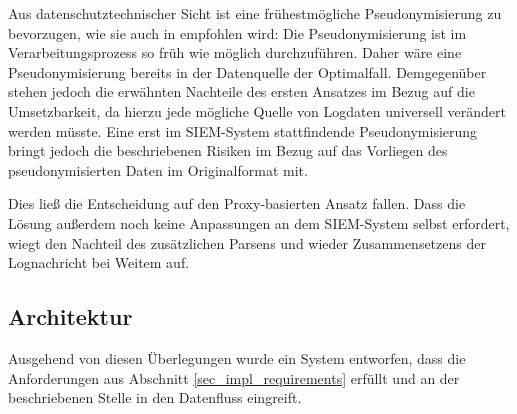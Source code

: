 Aus datenschutztechnischer Sicht ist eine frühestmögliche Pseudonymisierung zu bevorzugen, wie sie auch in \cite{schwartmann2017} empfohlen wird: 
\glqq{}Die Pseudonymisierung ist im Verarbeitungsprozess so früh wie möglich durchzuführen.\grqq{}
Daher wäre eine Pseudonymisierung bereits in der Datenquelle der Optimalfall. Demgegenüber stehen jedoch die erwähnten Nachteile des ersten Ansatzes im Bezug auf die Umsetzbarkeit, da hierzu jede mögliche Quelle von Logdaten universell verändert werden müsste. Eine erst im SIEM-System stattfindende Pseudonymisierung bringt jedoch die beschriebenen Risiken im Bezug auf das Vorliegen des pseudonymisierten Daten im Originalformat mit.

Dies ließ die Entscheidung auf den Proxy-basierten Ansatz fallen. Dass die Lösung außerdem noch keine Anpassungen an dem SIEM-System selbst erfordert, wiegt den Nachteil des zusätzlichen Parsens und wieder Zusammensetzens der Lognachricht bei Weitem auf.

\subsection{Architektur}

\label{sec_over_architecture}


Ausgehend von diesen Überlegungen wurde ein System entworfen, dass die Anforderungen aus Abschnitt \ref{sec_impl_requirements} erfüllt und an der beschriebenen Stelle in den Datenfluss eingreift. 


